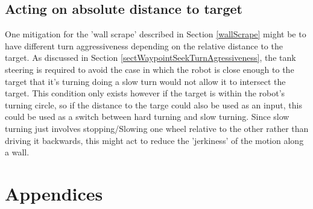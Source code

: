 \documentclass[11pt]{article}
\numberwithin{equation}{section}
\begin{document}
\subsection{Acting on absolute distance to target}
\label{sec:orgf1f774b}
One mitigation for the 'wall scrape' described in Section \ref{wallScrape} might be to have different turn aggressiveness depending on the relative distance to the target. As discussed in Section \ref{sectWaypointSeekTurnAgressiveness}, the tank steering is required to avoid the case in which the robot is close enough to the target that it's turning doing a slow turn would not allow it to intersect the target. This condition only exists however if the target is within the robot's turning circle, so if the distance to the targe could also be used as an input, this could be used as a switch between hard turning and slow turning. Since slow turning just involves stopping/Slowing one wheel relative to the other rather than driving it backwards, this might act to reduce the 'jerkiness' of the motion along a wall.

\section{Appendices}
\label{sec:org36f3313}
\end{document}
